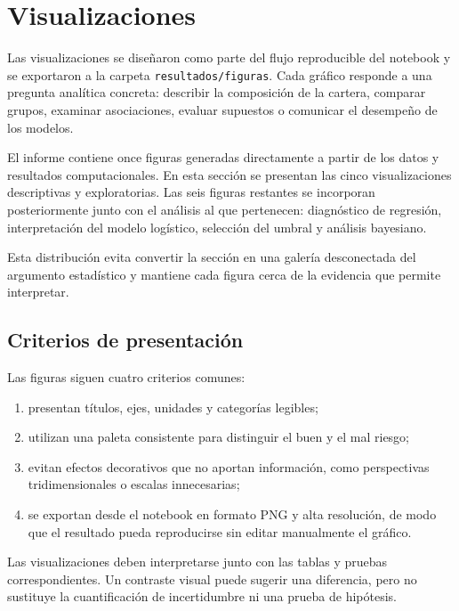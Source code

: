 \section{Visualizaciones}
\label{sec:visualizaciones}

Las visualizaciones se diseñaron como parte del flujo reproducible del
notebook y se exportaron a la carpeta
\texttt{resultados/figuras}. Cada gráfico responde a una pregunta
analítica concreta: describir la composición de la cartera, comparar
grupos, examinar asociaciones, evaluar supuestos o comunicar el
desempeño de los modelos.

El informe contiene once figuras generadas directamente a partir de los
datos y resultados computacionales. En esta sección se presentan las
cinco visualizaciones descriptivas y exploratorias. Las seis figuras
restantes se incorporan posteriormente junto con el análisis al que
pertenecen: diagnóstico de regresión, interpretación del modelo
logístico, selección del umbral y análisis bayesiano.

Esta distribución evita convertir la sección en una galería
desconectada del argumento estadístico y mantiene cada figura cerca de la
evidencia que permite interpretar.

\subsection{Criterios de presentación}

Las figuras siguen cuatro criterios comunes:

\begin{enumerate}
    \item presentan títulos, ejes, unidades y categorías legibles;

    \item utilizan una paleta consistente para distinguir el buen y el
    mal riesgo;

    \item evitan efectos decorativos que no aportan información, como
    perspectivas tridimensionales o escalas innecesarias;

    \item se exportan desde el notebook en formato PNG y alta resolución,
    de modo que el resultado pueda reproducirse sin editar manualmente
    el gráfico.
\end{enumerate}

Las visualizaciones deben interpretarse junto con las tablas y pruebas
correspondientes. Un contraste visual puede sugerir una diferencia, pero
no sustituye la cuantificación de incertidumbre ni una prueba de
hipótesis.

